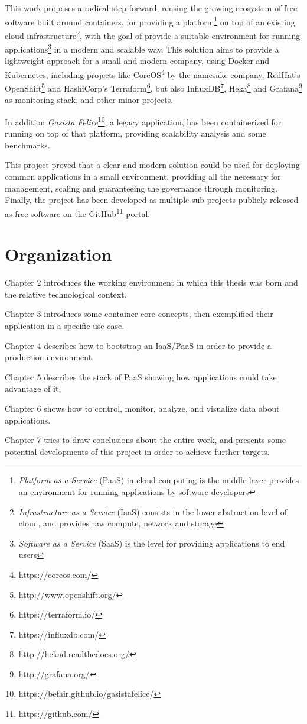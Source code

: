 This work proposes a radical step forward, reusing the growing ecosystem of free software built around containers, for providing a platform\footnote{\textit{Platform as a Service} (PaaS) in cloud computing is the middle layer provides an environment for running applications by software developers} on top of an existing cloud infrastructure\footnote{\textit{Infrastructure as a Service} (IaaS) consists in the lower abstraction level of cloud, and provides raw compute, network and storage}, with the goal of provide a suitable environment for running applications\footnote{\textit{Software as a Service} (SaaS) is the level for providing applications to end users} in a modern and scalable way.  This solution aims to provide a lightweight approach for a small and modern company, using Docker and Kubernetes, including projects like CoreOS\footnote{https://coreos.com/} by the namesake company, RedHat's OpenShift\footnote{http://www.openshift.org/} and HashiCorp's Terraform\footnote{https://terraform.io/}, but also InfluxDB\footnote{https://influxdb.com/}, Heka\footnote{http://hekad.readthedocs.org/} and Grafana\footnote{http://grafana.org/} as monitoring stack, and other minor projects.

In addition \textit{Gasista Felice}\footnote{https://befair.github.io/gasistafelice/}, a legacy application, has been containerized for running on top of that platform, providing scalability analysis and some benchmarks.

This project proved that a clear and modern solution could be used for deploying common applications in a small environment, providing all the necessary for management, scaling and guaranteeing the governance through monitoring.  Finally, the project has been developed as multiple sub-projects publicly released as free software on the GitHub\footnote{https://github.com/} portal.

\section{Organization}\label{organization}

Chapter 2 introduces the working environment in which this thesis was born and the relative technological context.

Chapter 3 introduces some container core concepts, then exemplified their application in a specific use case.

Chapter 4 describes how to bootstrap an IaaS/PaaS in order to provide a production environment.

Chapter 5 describes the stack of PaaS showing how applications could take advantage of it.

Chapter 6 shows how to control, monitor, analyze, and visualize data
about applications.

Chapter 7 tries to draw conclusions about the entire work, and presents some potential developments of this project in order to achieve further targets.